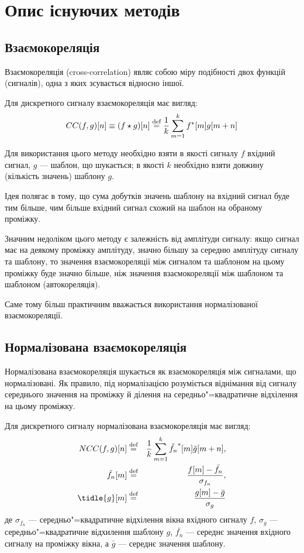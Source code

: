 \section{Опис існуючих методів}
    \subsection{Взаємокореляція}
        Взаємокореляція (cross-correlation) являє собою міру подібності двох функцій (сигналів), одна з яких
        зсувається відносно іншої.

        Для дискретного сигналу взаємокореляція має вигляд:
        \begin{equation}
            CC(f,g)[ n ] \equiv (f \star g)[ n ] \stackrel{\text{def}}{=} \frac{1}{k}\sum\limits_{m=1}^{k} f^*[m] g[ m + n ]
        \end{equation}

        Для використання цього методу необхідно взяти в якості сигналу $f$ вхідний сигнал, $g$ --- шаблон, що
        шукається; в якості $k$ необхідно взяти довжину (кількість значень) шаблону $g$.

        Ідея полягає в тому, що сума добутків значень шаблону на вхідний сигнал буде тим більше, чим більше вхідний
        сигнал схожий на шаблон на обраному проміжку.

        Значним недоліком цього методу є залежність від амплітуди сигналу: якщо сигнал має на деякому проміжку
        амплітуду, значно більшу за середню амплітуду сигналу та шаблону, то значення взаємокореляції між сигналом та
        шаблоном на цьому проміжку буде значно більше, ніж значення взаємокореляції між шаблоном та шаблоном
        (автокореляція).

        Саме тому більш практичним вважається використання нормалізованої взаємокореляції.
    \subsection{Нормалізована взаємокореляція}
        Нормалізована взаємокореляція шукається як взаємокореляція між сигналами, що нормалізовані.
        Як правило, під нормалізацією розуміється віднімання від сигналу середнього значення на проміжку й ділення на
        середньо"=квадратичне відхілення на цьому проміжку.

        Для дискретного сигналу нормалізована взаємокореляція має вигляд:
        \begin{eqnarray}
            NCC(f,g)[ n ] &\defeq& \frac{1}{k} \sum\limits_{m=1}^{k} \tilde{f_n}^*[m] \tilde{g}[ m + n ],\\
            \tilde{f_n}[m] &\defeq& \frac{f[m] - \bar{f_n}}{\sigma_{f_n}},\\
            \tidle{g}[m]   &\defeq& \frac{g[m] - \bar{g}}{\sigma_g}
        \end{eqnarray}
        де $\sigma_{f_n}$ --- середньо"=квадратичне відхілення вікна вхідного сигналу $f$, $\sigma_g$ ---
        середньо"=квадратичне відхилення шаблону $g$, $\bar{f_n}$ --- середнє значення вхідного сигналу на проміжку
        вікна, а $\bar{g}$ --- середнє значення шаблону.

